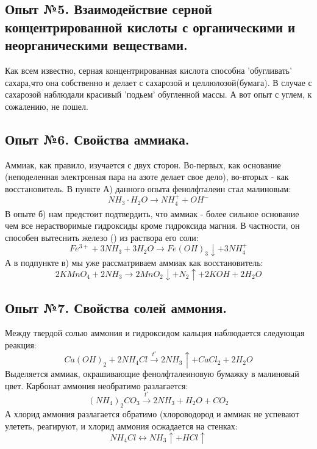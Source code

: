 \documentclass[a4paper,12pt]{article}
\newcommand{\RomanNumeralCaps}[1]
    {\MakeUppercase{\romannumeral #1}}
\begin{document}
\subsection{Опыт №5. Взаимодействие серной концентрированной кислоты с органическими и неорганическими веществами.}
Как всем известно, серная концентрированная кислота способна 'обугливать' сахара,что она собственно  и делает с сахарозой и целлюлозой(бумага). В случае с сахарозой наблюдали красивый 'подьем' обугленной массы. А вот опыт с углем, к сожалению, не пошел.
\subsection{Опыт №6. Свойства аммиака.}
Аммиак, как правило, изучается с двух сторон. Во-первых, как основание (неподеленная электронная пара на азоте делает свое дело), во-вторых - как восстановитель. В пункте А) данного опыта фенолфталеин стал малиновым:
\begin{equation}
    NH_3\cdot H_2O \xrightarrow[]{} NH_4^+ + OH^-
\end{equation}
В опыте б) нам предстоит подтвердить, что аммиак - более сильное основание чем все нерастворимые гидроксиды кроме гидроксида магния. В частности, он способен вытеснить железо (\RomanNumeralCaps{3}) из раствора его соли:
\begin{equation}
    Fe^{3+} + 3NH_3 + 3H_2O \xrightarrow[]{} Fe(OH)_3\downarrow + 3NH_4^{+}
\end{equation}
А в подпункте в) мы уже рассматриваем аммиак как восстановитель:
\begin{equation}
    2KMnO_4 + 2NH_3 \xrightarrow{} 2MnO_2\downarrow + N_2\uparrow + 2KOH + 2H_2O
\end{equation}
\subsection{Опыт №7. Свойства солей аммония. }
Между твердой солью аммония и гидроксидом кальция наблюдается следующая реакция:
\begin{equation}
    Ca(OH)_2 + 2NH_4Cl \xrightarrow[]{t^{\circ}} 2NH_3\uparrow + CaCl_2 + 2H_2O
\end{equation}
Выделяется аммиак, окрашивающие фенолфталеиновую бумажку в малиновый цвет.\newline
Карбонат аммония необратимо разлагается:
\begin{equation}
    (NH_4)_2CO_3 \xrightarrow[]{t^{\circ}} 2NH_3 + H_2O + CO_2
\end{equation}
 А хлорид аммония разлагается обратимо (хлороводород и аммиак не успевают улететь, реагируют, и хлорид аммония осжадается на стенках:
 \begin{equation}
     NH_4Cl \longleftrightarrow NH_3 \uparrow + HCl\uparrow
 \end{equation}
\end{document}
